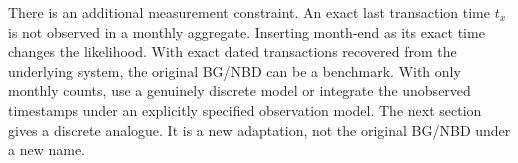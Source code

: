 There is an additional measurement constraint. An exact last transaction time $t_x$ is not observed in a monthly aggregate. Inserting month-end as its exact time changes the likelihood. With exact dated transactions recovered from the underlying system, the original BG/NBD can be a benchmark. With only monthly counts, use a genuinely discrete model or integrate the unobserved timestamps under an explicitly specified observation model. The next section gives a discrete analogue. It is a new adaptation, not the original BG/NBD under a new name.
